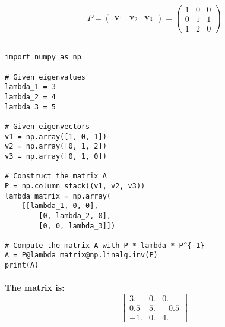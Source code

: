 \paragraph{
    $$
        P =
        \begin{pmatrix}
            \mathbf{v}_1 & \mathbf{v}_2 & \mathbf{v}_3
        \end{pmatrix} =
        \begin{pmatrix}
            1 & 0 & 0 \\
            0 & 1 & 1 \\
            1 & 2 & 0
        \end{pmatrix}
    $$
}
% 
% 
% 
% 
% 
% 
% 
$$$$
\begin{lstlisting}[style=pystyle]
import numpy as np

# Given eigenvalues
lambda_1 = 3
lambda_2 = 4
lambda_3 = 5

# Given eigenvectors
v1 = np.array([1, 0, 1])
v2 = np.array([0, 1, 2])
v3 = np.array([0, 1, 0])

# Construct the matrix A
P = np.column_stack((v1, v2, v3))
lambda_matrix = np.array(
    [[lambda_1, 0, 0], 
        [0, lambda_2, 0], 
        [0, 0, lambda_3]])

# Compute the matrix A with P * lambda * P^{-1}
A = P@lambda_matrix@np.linalg.inv(P)
print(A)
\end{lstlisting}
% 
% 
% 
% 
% 
\paragraph{\textbf{The matrix is:}
    $$
        \left[
            \begin{matrix}
                3.   & 0. & 0.   \\
                0.5  & 5. & -0.5 \\
                -1. & 0. & 4.
            \end{matrix}
            \right]
    $$}